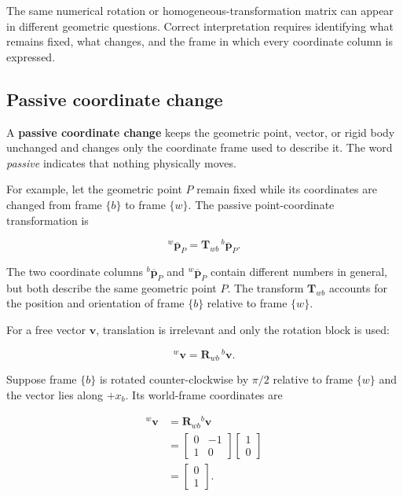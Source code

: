 \documentclass[
  australian,
  12pt,
  letterpaper,
  DIV=11,
  numbers=noendperiod,
  twoside]{scrreprt}
\begin{document}
The same numerical rotation or homogeneous-transformation matrix can
appear in different geometric questions. Correct interpretation requires
identifying what remains fixed, what changes, and the frame in which
every coordinate column is expressed.

\subsection{Passive coordinate change}\label{passive-coordinate-change}

A \textbf{passive coordinate change} keeps the geometric point, vector,
or rigid body unchanged and changes only the coordinate frame used to
describe it. The word \emph{passive} indicates that nothing physically
moves.

For example, let the geometric point \(P\) remain fixed while its
coordinates are changed from frame \(\{b\}\) to frame \(\{w\}\). The
passive point-coordinate transformation is

\[
{}^{w}\overline{\mathbf p}_P
=
\mathbf T_{wb}\,{}^{b}\overline{\mathbf p}_P.
\]

The two coordinate columns \({}^{b}\overline{\mathbf p}_P\) and
\({}^{w}\overline{\mathbf p}_P\) contain different numbers in general,
but both describe the same geometric point \(P\). The transform
\(\mathbf T_{wb}\) accounts for the position and orientation of frame
\(\{b\}\) relative to frame \(\{w\}\).

For a free vector \(\mathbf v\), translation is irrelevant and only the
rotation block is used:

\[
{}^{w}\mathbf v
=
\mathbf R_{wb}\,{}^{b}\mathbf v.
\]

Suppose frame \(\{b\}\) is rotated counter-clockwise by \(\pi/2\)
relative to frame \(\{w\}\) and the vector lies along \(+x_b\). Its
world-frame coordinates are

\[
\begin{aligned}
{}^{w}\mathbf v
&=
\mathbf R_{wb}{}^{b}\mathbf v\\
&=
\begin{bmatrix}
0&-1\\
1&0
\end{bmatrix}
\begin{bmatrix}
1\\0
\end{bmatrix}\\
&=
\begin{bmatrix}
0\\1
\end{bmatrix}.
\end{aligned}
\]
\end{document}
